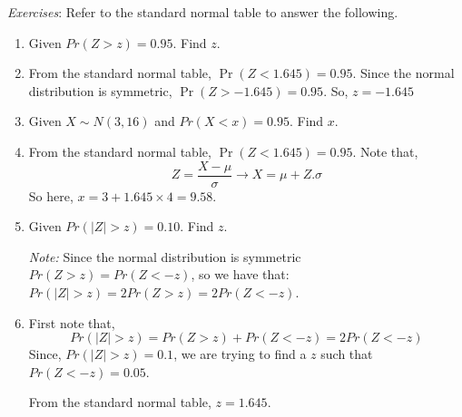 \documentclass{./../../Latex/handout}
\begin{document}
\textit{Exercises}: Refer to the standard normal table to answer the following.
\begin{enumerate}
\item Given $Pr(Z>z) = 0.95 $. Find $z$. 
\item[] From the standard normal table, $\Pr(Z<1.645)=0.95$. Since the normal distribution is symmetric, $\Pr(Z>-1.645)=0.95$. So, $z=-1.645$
\item Given  $X \sim N(3, 16)$ and $Pr(X<x) = 0.95 $. Find $x$. 
\item[] From the standard normal table, $\Pr(Z<1.645)=0.95$. Note that,
$$ Z=\frac{X-\mu}{\sigma} \rightarrow X = \mu + Z.\sigma $$
So here, $x = 3 + 1.645 \times 4 = 9.58$.
\item Given $Pr(|Z|>z) = 0.10 $. Find $z$. \\ \vspace{-0.25cm}

\textit{Note:} Since the normal distribution is symmetric $Pr(Z>z)=Pr(Z<-z)$, so we have that: $Pr(|Z|>z) = 2 Pr(Z>z) = 2 Pr(Z<-z) $. 
\item[] First note that, $$Pr(|Z|>z) = Pr(Z>z) + Pr(Z<-z) = 2 Pr(Z<-z) $$
Since, $Pr(|Z|>z)=0.1$, we are trying to find a $z$ such that $Pr(Z<-z)=0.05$.
\begin{center}
\end{center}
 From the standard normal table, $z=1.645$. 
\end{enumerate}
\end{document}
